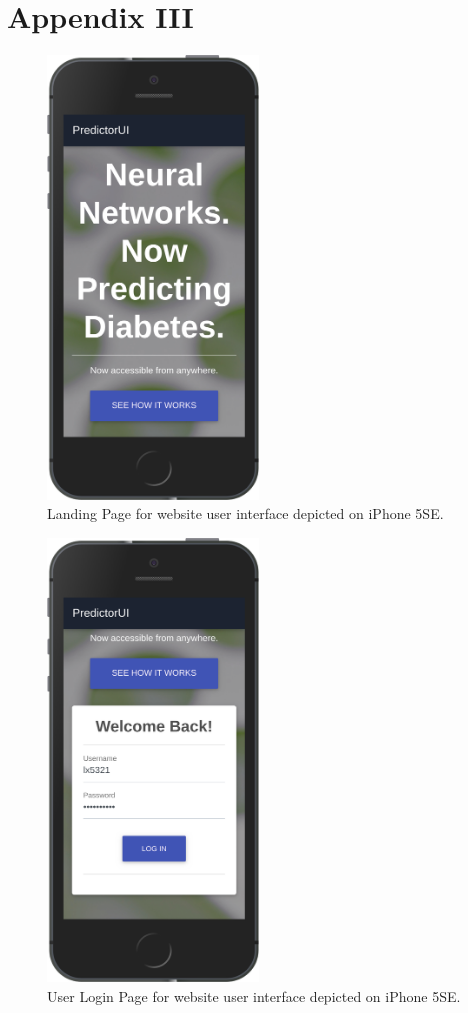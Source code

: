 \documentclass[12pt]{article}
\begin{document}
\section{Appendix III}
\begin{figure}[ht]
\centering
\includegraphics[width=0.5\textwidth]{1se.png}
\caption{\label{fig:50} Landing Page for website user interface depicted on iPhone 5SE.}
\end{figure}
\begin{figure}[ht]
\centering
\includegraphics[width=0.5\textwidth]{2se.png}
\caption{\label{fig:51} User Login Page for website user interface depicted on iPhone 5SE.}
\end{figure}
\end{document}
